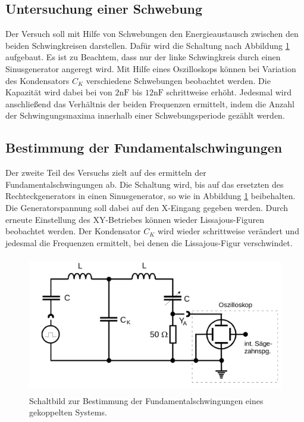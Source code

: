 \subsection{Untersuchung einer Schwebung} 
\label{sub:Untersuchung einer Schwebung}



Der Versuch soll mit Hilfe von Schwebungen den Energieaustausch zwischen den beiden Schwingkreisen darstellen.
Dafür wird die Schaltung nach Abbildung \ref{fig:bild6} aufgebaut. Es ist zu Beachtem, dass nur der linke Schwingkreis durch einen Sinusgenerator angeregt wird.
Mit Hilfe eines Oszilloskops können bei Variation des 
Kondensators $C_K$ verschiedene Schwebungen beobachtet werden. Die Kapazität wird dabei bei von $2\si{\nano\farad}$  bis $12\si{\nano\farad}$
schrittweise erhöht. Jedesmal wird anschließend das Verhältnis der beiden Frequenzen ermittelt, indem die Anzahl der Schwingungsmaxima innerhalb einer Schwebungsperiode 
gezählt werden.


\subsection{Bestimmung der Fundamentalschwingungen}
\label{sub:Bestimmung der Fundamentalschwingungen}



Der zweite Teil des Versuchs zielt auf des ermitteln der Fundamentalschwingungen ab. Die Schaltung wird, bis auf das ersetzten des Rechteckgenerators in
einen Sinusgenerator, so wie in Abbildung \ref{fig:bild6} beibehalten. Die Generatorspannung soll dabei auf den X-Eingang gegeben werden.
Durch erneute Einstellung des XY-Betriebes können wieder Lissajous-Figuren beobachtet werden. Der Kondensator $C_K$ wird wieder schrittweise verändert und jedesmal die Frequenzen ermittelt, bei 
denen die Lissajous-Figur verschwindet. 


\begin{figure}

    \centering
    \includegraphics[height=6.0cm]{data/Bild6.png}
    \caption{Schaltbild zur Bestimmung der Fundamentalschwingungen eines gekoppelten Systems.}
    \label{fig:bild6}
\end{figure}





